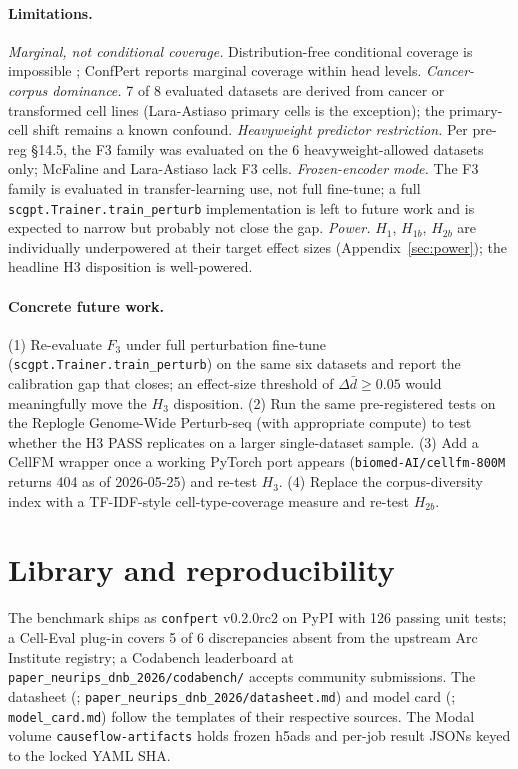 \documentclass[11pt]{article}
\begin{document}
\paragraph{Limitations.}
\emph{Marginal, not conditional coverage.} Distribution-free conditional
coverage is impossible \cite{vovk2012}; ConfPert reports marginal
coverage within head levels.
\emph{Cancer-corpus dominance.} 7 of 8 evaluated datasets are derived
from cancer or transformed cell lines (Lara-Astiaso primary cells is the
exception); the primary-cell shift remains a known confound.
\emph{Heavyweight predictor restriction.} Per pre-reg \S 14.5, the F3
family was evaluated on the 6 heavyweight-allowed datasets only;
McFaline and Lara-Astiaso lack F3 cells. \emph{Frozen-encoder mode.}
The F3 family is evaluated in transfer-learning use, not full fine-tune;
a full \texttt{scgpt.Trainer.train\_perturb} implementation is left to
future work and is expected to narrow but probably not close the gap.
\emph{Power.} $H_1$, $H_{1b}$, $H_{2b}$ are individually underpowered at
their target effect sizes (Appendix~\ref{sec:power}); the headline H3
disposition is well-powered.

\paragraph{Concrete future work.}
(1) Re-evaluate $F_3$ under full perturbation fine-tune
(\texttt{scgpt.Trainer.train\_perturb}) on the same six datasets and
report the calibration gap that closes; an effect-size threshold of
$\Delta \bar d \geq 0.05$ would meaningfully move the $H_3$
disposition. (2) Run the same pre-registered tests on the Replogle
Genome-Wide Perturb-seq (with appropriate compute) to test whether the
H3 PASS replicates on a larger single-dataset sample. (3) Add a CellFM
wrapper once a working PyTorch port appears
(\texttt{biomed-AI/cellfm-800M} returns 404 as of 2026-05-25) and
re-test $H_3$. (4) Replace the corpus-diversity index with a
TF-IDF-style cell-type-coverage measure and re-test $H_{2b}$.

\section{Library and reproducibility}
\label{sec:lib}

The benchmark ships as \texttt{confpert} v0.2.0rc2 on PyPI with 126
passing unit tests; a Cell-Eval plug-in covers 5 of 6 discrepancies
absent from the upstream Arc Institute registry; a Codabench
leaderboard at \texttt{paper\_neurips\_dnb\_2026/codabench/} accepts
community submissions. The datasheet (\citealt{gebru2021datasheets};
\texttt{paper\_neurips\_dnb\_2026/datasheet.md}) and model card
(\citealt{mitchell2019model}; \texttt{model\_card.md}) follow the
templates of their respective sources. The Modal volume
\texttt{causeflow-artifacts} holds frozen h5ads and per-job result
JSONs keyed to the locked YAML SHA.
\end{document}
